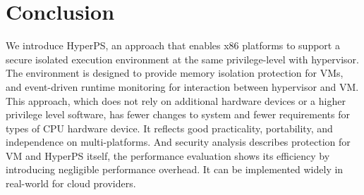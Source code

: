 \section{Conclusion}\label{sec:conclusion}
We introduce HyperPS, an approach that enables x86 platforms to support a secure isolated execution environment at the same privilege-level with hypervisor. The environment is designed to provide memory isolation protection for VMs, and event-driven runtime monitoring for interaction between hypervisor and VM. This approach, which does not rely on additional hardware devices or a higher privilege level software, has fewer changes to system and fewer requirements for types of CPU hardware device. It reflects good practicality, portability, and independence on multi-platforms. And security analysis describes protection for VM and HyperPS itself, the performance evaluation shows its efficiency by introducing negligible performance overhead. It can be implemented widely in real-world for cloud providers.


